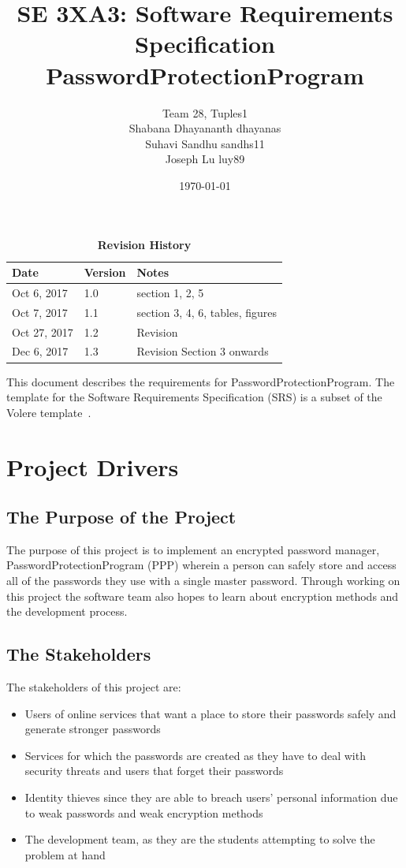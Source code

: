 \documentclass[12pt, titlepage]{article}
\title{SE 3XA3: Software Requirements Specification\\PasswordProtectionProgram}
\author{Team 28, Tuples1
		\\ Shabana Dhayananth dhayanas
		\\  Suhavi Sandhu sandhs11
		\\ Joseph Lu luy89
}
\date{\today}
\begin{document}
\maketitle

\tableofcontents
\listoftables
\listoffigures

\begin{table}[bp]
\caption{\bf Revision History}
\begin{tabularx}{\textwidth}{p{3cm}p{2cm}X}
\toprule {\bf Date} & {\bf Version} & {\bf Notes}\\
\midrule
Oct 6, 2017 & 1.0 & section 1, 2, 5 \\
Oct 7, 2017 & 1.1 & section 3, 4, 6, tables, figures \\
Oct 27, 2017 & 1.2 & Revision \\
Dec 6, 2017 & 1.3 & Revision Section 3 onwards\\
\bottomrule
\end{tabularx}
\end{table}

\newpage


This document describes the requirements for PasswordProtectionProgram.  The template for the Software
Requirements Specification (SRS) is a subset of the Volere
template~\cite{RobertsonAndRobertson2012:1}.

\section{Project Drivers}

\subsection{The Purpose of the Project}

The purpose of this project is to implement an encrypted password manager, PasswordProtectionProgram (PPP) wherein a person can 
safely store and access all of the passwords they use with a single master password. Through working on this project the software 
team also hopes to learn about encryption methods and the development process.

\subsection{The Stakeholders}

The stakeholders of this project are:
\begin{itemize}
\item Users of online services that want a place to store their passwords safely and generate stronger passwords
\item Services for which the passwords are created as they have to deal with security threats and users that forget their passwords
\item Identity thieves since they are able to breach users’ personal information due to weak passwords and weak encryption methods
\item The development team, as they are the students attempting to solve the problem at hand
\end{itemize}
\end{document}
